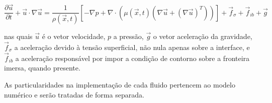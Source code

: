 \begin{equation}
    \frac{\partial \vec{u}}{\partial t} + \vec{u} \cdot \nabla \vec{u}
    = \frac{1}{\rho (\vec{x},t)} \left[
        - \nabla p
        + \nabla \cdot \left( \mu (\vec{x},t) \left( \nabla \vec{u} + (\nabla \vec{u})^{T} \right) \right)
    \right]
    + \vec{f}_{\sigma}
    + \vec{f}_{ib}
    + \vec{g}
    \label{eq:navier-stokes-incompressivel-completa}
\end{equation}

nas quais $\vec{u}$ é o vetor velocidade, $p$ a pressão, $\vec{g}$ o vetor aceleração da gravidade, $\vec{f}_{\sigma}$ a aceleração devido à tensão superficial, não nula apenas sobre a interface, e $\vec{f}_{ib}$ a aceleração responsável por impor a condição de contorno sobre a fronteira imersa, quando presente.

As particularidades na implementação de cada fluido pertencem ao modelo numérico e serão tratadas de forma separada.

